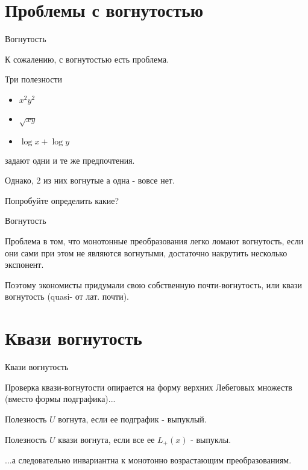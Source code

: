 \documentclass{beamer}
\begin{document}
\section{Проблемы с вогнутостью}

\begin{frame}{Вогнутость}

К сожалению, с вогнутостью есть проблема. 

Три полезности
\begin{itemize}
  \item $x^2y^2$
  \item $\sqrt{xy}$
  \item $\log x + \log y$
\end{itemize}
задают одни и те же предпочтения.

Однако, 2 из них вогнутые а одна - вовсе нет.

Попробуйте определить какие?

\end{frame}

\begin{frame}{Вогнутость}

Проблема в том, что монотонные преобразования легко ломают вогнутость, если они сами при этом не являются вогнутыми, достаточно накрутить несколько экспонент.

Поэтому экономисты придумали свою собственную почти-вогнутость, или \alert{квази вогнутость} (quasi- от лат. почти).

\end{frame}

\section{Квази вогнутость}

\begin{frame}{Квази вогнутость}

Проверка квази-вогнутости опирается на форму верхних Лебеговых множеств (вместо формы подграфика)...

\begin{definition}
Полезность $U$ \alert{вогнута}, если ее подграфик - выпуклый. 
\end{definition}

\begin{definition}
Полезность $U$ \alert{квази вогнута}, если все ее $L_{+}(x)$ - выпуклы. 
\end{definition}

...а следовательно инвариантна к монотонно возрастающим преобразованиям.

\end{frame}
\end{document}
